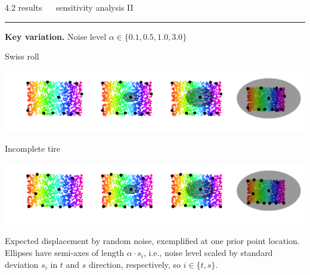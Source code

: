 \documentclass[11pt, compress, t, notes = noshow, xcolor = table, 
aspectratio = 1610]{beamer}
\begin{document}

\LARGE
\begin{frame}{\textcolor{gray!90}{4.2 results} ~~ sensitivity analysis II}
\normalsize
\vspace{-0.5cm}
\noindent \textcolor{gray!90}{\rule{\textwidth}{1pt}}
\smallskip

\textbf{Key variation.} Noise level $\alpha \in \{0.1, 0.5, 1.0, 3.0\}$ 

\vspace{0.3cm}

\begin{minipage}[c]{0.2\textwidth}
  Swiss roll
\end{minipage}%
\begin{minipage}[c]{0.8\textwidth}
  \includegraphics[trim = 40 30 0 0, clip, %
    width = \textwidth]{figures/sensitivity_noise_key_swiss}
\end{minipage}

\vspace{0.3cm}   

\begin{minipage}[c]{0.2\textwidth}
  Incomplete tire
\end{minipage}%
\begin{minipage}[c]{0.8\textwidth}
  \includegraphics[trim = 40 30 0 0, clip, %
    width = \textwidth]{figures/sensitivity_noise_key_tire}
\end{minipage}

\vfill

\scriptsize
Expected displacement by random noise, exemplified at one prior point location. 
\\
Ellipses have semi-axes of length $\alpha \cdot s_i$, i.e., noise level scaled 
by standard deviation $s_i$ in $t$ and $s$ direction, respectively, so
$i \in \{t, s\}$.

\end{frame}
\end{document}
